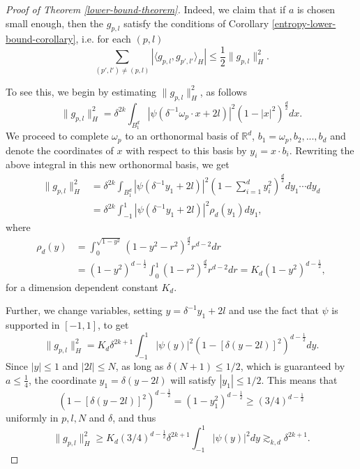 \begin{proof}[Proof of Theorem \ref{lower-bound-theorem}]
 Indeed, we claim that if $a$ is chosen small enough, then the $g_{p,l}$ satisfy the conditions of Corollary \ref{entropy-lower-bound-corollary}, i.e. for each $(p,l)$
 \begin{equation}
  \sum_{(p',l')\neq (p,l)} |\langle g_{p,l}, g_{p',l'}\rangle_H| \leq \frac{1}{2}\|g_{p,l}\|^2_H.
 \end{equation}
 
 To see this, we begin by estimating $\|g_{p,l}\|^2_H$, as follows
 \begin{equation}
  \|g_{p,l}\|^2_H = \delta^{2k}\int_{B_1^d} |\psi(\delta^{-1}\omega_p \cdot x + 2l)|^2(1-|x|^2)^{\frac{d}{2}}dx.
 \end{equation}
 We proceed to complete $\omega_p$ to an orthonormal basis of $\mathbb{R}^d$, $b_1 = \omega_p, b_2,...,b_d$ and denote the coordinates of $x$ with respect to this basis by $y_i = x\cdot b_i$. Rewriting the above integral in this new orthonormal basis, we get
 \begin{equation}
 \begin{split}
  \|g_{p,l}\|^2_H &= \delta^{2k}\int_{B_1^d}|\psi(\delta^{-1}y_1 + 2l)|^2\left(1-\sum_{i=1}^d y_i^2\right)^{\frac{d}{2}}dy_1\cdots dy_d \\
  &= \delta^{2k}\int_{-1}^1|\psi(\delta^{-1}y_1 + 2l)|^2 \rho_d(y_1)dy_1,
  \end{split}
 \end{equation}
 where
 \begin{equation}
 \begin{split}
  \rho_d(y) &= \int_0^{\sqrt{1-y^2}} (1-y^2-r^2)^{\frac{d}{2}}r^{d-2}dr\\ 
  &= (1-y^2)^{d-\frac{1}{2}}\int_0^{1} (1-r^2)^{\frac{d}{2}}r^{d-2}dr = K_d(1-y^2)^{d-\frac{1}{2}},
  \end{split}
 \end{equation}
 for a dimension dependent constant $K_d$.

 Further, we change variables, setting $y = \delta^{-1}y_1 + 2l$ and use the fact that $\psi$ is supported in $[-1,1]$, to get
 \begin{equation}
  \|g_{p,l}\|^2_H = K_d\delta^{2k+1}\int_{-1}^1 |\psi(y)|^2 (1-[\delta(y-2l)]^2)^{d-\frac{1}{2}} dy.
 \end{equation}
  Since $|y| \leq 1$ and $|2l| \leq N$, as long as $\delta(N+1) \leq 1/2$, which is guaranteed by $a \leq \frac{1}{4}$, the coordinate $y_1 = \delta(y-2l)$ will satisfy $|y_1| \leq 1/2$. This means that $$(1-[\delta(y-2l)]^2)^{d-\frac{1}{2}} = (1-y_1^2)^{d-\frac{1}{2}} \geq (3/4)^{d-\frac{1}{2}}$$ uniformly in $p,l,N$ and $\delta$, and thus
 \begin{equation}\label{lower-bound}
  \|g_{p,l}\|^2_H \geq K_d(3/4)^{d-\frac{1}{2}}\delta^{2k+1}\int_{-1}^1 |\psi(y)|^2dy \gtrsim_{k,d} \delta^{2k+1}.
 \end{equation}
 

\end{proof}
